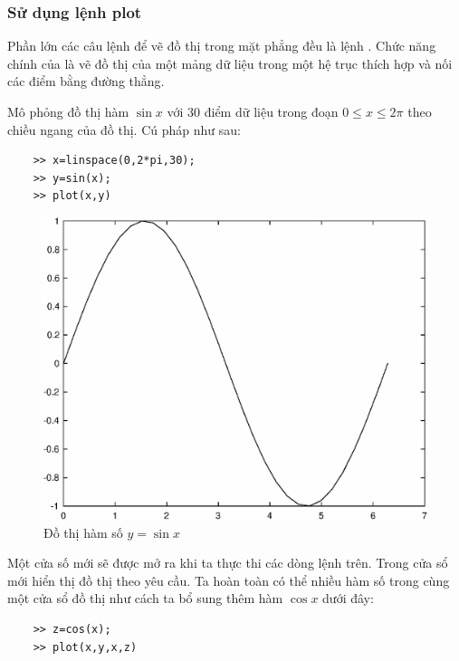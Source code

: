\documentclass[12pt,a4paper]{article}
\begin{document}
\subsubsection{Sử dụng lệnh plot}
Phần lớn các câu lệnh để vẽ đồ thị trong mặt phẳng đều là lệnh . Chức năng chính của  là vẽ đồ thị của một mảng dữ liệu trong một hệ trục thích hợp và nối các điểm bằng đường thẳng.
\begin{example}
Mô phỏng đồ thị hàm $\sin{x}$ với 30 điểm dữ liệu trong đoạn $0\leq x\leq 2\pi$	 theo chiều ngang của đồ thị. Cú pháp như sau:
\begin{lstlisting}
	>> x=linspace(0,2*pi,30);
	>> y=sin(x);
	>> plot(x,y)
\end{lstlisting}
\begin{center}
	\begin{figure}[htp]
	\begin{center}
		\includegraphics[scale=0.6]{hinhtieuluan/dothi1}
	\end{center}
		\caption{Đồ thị hàm số $y=\sin{x}$}
		\label{refdothi1}
	\end{figure}
\end{center}
Một cửa số mới sẽ được mở ra khi ta thực thi các dòng lệnh trên. Trong cửa sổ mới hiển thị đồ thị theo yêu cầu. Ta hoàn toàn có thể nhiều hàm số trong cùng một cửa sổ đồ thị như cách ta bổ sung thêm hàm $\cos{x}$ dưới đây:
\begin{lstlisting}
	>> z=cos(x);
	>> plot(x,y,x,z)
\end{lstlisting}
\begin{center}

\end{center}
\end{example}
\end{document}
